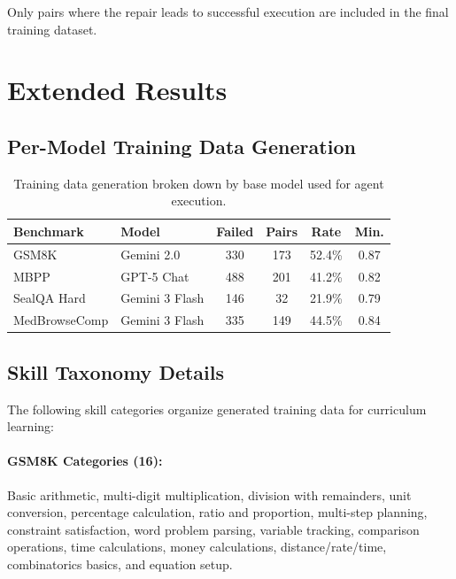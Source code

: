 \documentclass{article}
\theoremstyle{plain}
\theoremstyle{definition}
\theoremstyle{remark}
\begin{document}
Only pairs where the repair leads to successful execution are included in the final training dataset.

\section{Extended Results}

\subsection{Per-Model Training Data Generation}

\begin{table}[h]
  \caption{Training data generation broken down by base model used for agent execution.}
  \centering
  \begin{small}
    \begin{tabular}{llcccc}
      \toprule
      Benchmark & Model & Failed & Pairs & Rate & Min. \\
      \midrule
      GSM8K & Gemini 2.0 & 330 & 173 & 52.4\% & 0.87 \\
      MBPP & GPT-5 Chat & 488 & 201 & 41.2\% & 0.82 \\
      SealQA Hard & Gemini 3 Flash & 146 & 32 & 21.9\% & 0.79 \\
      MedBrowseComp & Gemini 3 Flash & 335 & 149 & 44.5\% & 0.84 \\
      \bottomrule
    \end{tabular}
  \end{small}
\end{table}

\subsection{Skill Taxonomy Details}

The following skill categories organize generated training data for curriculum learning:

\paragraph{GSM8K Categories (16):}
Basic arithmetic, multi-digit multiplication, division with remainders, unit conversion, percentage calculation, ratio and proportion, multi-step planning, constraint satisfaction, word problem parsing, variable tracking, comparison operations, time calculations, money calculations, distance/rate/time, combinatorics basics, and equation setup.
\end{document}
